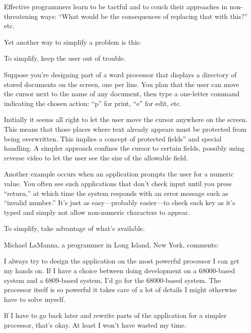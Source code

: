 \noindent Effective programmers learn to be tactful and to couch their
approaches in non-threatening ways: ``What would be the consequences
of replacing that with this?'' etc.

Yet another way to simplify a problem is this:

\begin{tip}
To simplify, keep the user out of trouble.
\end{tip}
Suppose you're designing part of a word processor that displays a
directory of stored documents on the screen, one per line. You plan
that the
user can move the cursor next to the name of any document, then type a
one-letter command indicating the chosen action: ``p'' for print,
``e'' for edit, etc.

Initially it seems all right to let the user move the cursor anywhere
on the screen. This means that those places where text already appears
must be protected from being overwritten. This implies a concept of
protected fields'' and special handling. A simpler approach confines
the cursor to certain fields, possibly using reverse video to let the
user see the size of the allowable field.

Another example occurs when an application prompts the user for a
numeric value. You often see such applications that don't check input
until you press ``return,'' at which time the system responds with an
error message such as ``invalid number.'' It's just as easy---probably
easier---to check each key as it's typed and simply not allow
non-numeric characters to appear.

\begin{tip}
To simplify, take advantage of what's available.
\end{tip}%
\begin{interview}
Michael LaManna, a \Forth{} programmer in Long Island, New York,
comments:

\begin{tfquot}
I always try to design the application on the most powerful processor
I can get my hands on. If I have a choice between doing development on
a 68000-based system and a 6809-based system, I'd go for the
68000-based system. The processor itself is so powerful it takes care
of a lot of details I might otherwise have to solve myself.

If I have to go back later and rewrite parts of the application for a
simpler processor, that's okay. At least I won't have wasted my time.
\end{tfquot}
\end{interview}%

